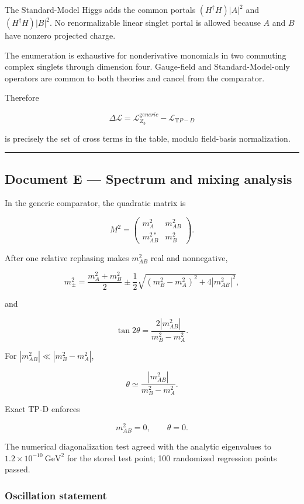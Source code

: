 \documentclass[
]{article}
\begin{document}
The Standard-Model Higgs adds the common portals \((H^\dagger H)|A|^2\)
and \((H^\dagger H)|B|^2\). No renormalizable linear singlet portal is
allowed because \(A\) and \(B\) have nonzero projected charge.

The enumeration is exhaustive for nonderivative monomials in two
commuting complex singlets through dimension four. Gauge-field and
Standard-Model-only operators are common to both theories and cancel
from the comparator.

Therefore

\[
\Delta\mathcal L
=\mathcal L_{Z_3}^{\mathrm generic}-\mathcal L_{\mathrm TP-D}
\]

is precisely the set of cross terms in the table, modulo field-basis
normalization.

\begin{center}\rule{0.5\linewidth}{0.5pt}\end{center}

\hypertarget{document-e-spectrum-and-mixing-analysis}{%
\subsection{Document E --- Spectrum and mixing
analysis}\label{document-e-spectrum-and-mixing-analysis}}

In the generic comparator, the quadratic matrix is

\[
M^2=\begin{pmatrix}
m_A^2&m_{AB}^2\\
m_{AB}^{2*}&m_B^2
\end{pmatrix}.
\]

After one relative rephasing makes \(m_{AB}^2\) real and nonnegative,

\[
m_\pm^2=\frac{m_A^2+m_B^2}{2}
\pm\frac12\sqrt{(m_B^2-m_A^2)^2+4|m_{AB}^2|^2},
\]

and

\[
\tan2\theta=\frac{2|m_{AB}^2|}{m_B^2-m_A^2}.
\]

For \(|m_{AB}^2|\ll|m_B^2-m_A^2|\),

\[
\theta\simeq\frac{|m_{AB}^2|}{m_B^2-m_A^2}.
\]

Exact TP-D enforces

\[
m_{AB}^2=0,\qquad \theta=0.
\]

The numerical diagonalization test agreed with the analytic eigenvalues
to \(1.2\times10^{-10}\ \mathrm{GeV}^2\) for the stored test point; 100
randomized regression points passed.

\hypertarget{oscillation-statement}{%
\subsubsection{Oscillation statement}\label{oscillation-statement}}
\end{document}
